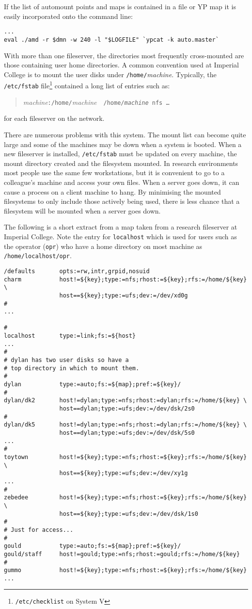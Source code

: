 If the list of automount points and maps is contained in a file or YP map
it is easily incorporated onto the command line:
\begin{verbatim}
...
eval ./amd -r $dmn -w 240 -l "$LOGFILE" `ypcat -k auto.master`
\end{verbatim}

With more than one fileserver, the directories most frequently
cross-mounted are those containing user home directories.
A common convention used at Imperial College is to mount
the user disks under {\tt /home/}{\em machine}.
Typically, the {\tt /etc/fstab} file\footnote{{\tt /etc/checklist}
on System V} contained a long list of entries
such as:
\begin{quote}
{\em machine}{\tt :/home/}{\em machine}\ \ \tt /home/{\em machine}\ nfs \ldots
\end{quote}
for each fileserver on the network.

There are numerous problems with this system.
The mount list can become quite large and some of the machines
may be down when a system is booted.
When a new fileserver is installed, {\tt /etc/fstab} must be
updated on every machine, the mount directory created and
the filesystem mounted.
In research environments most
people use the same few workstations, but it is convenient to go
to a colleague's machine and access your own files.
When a server goes down, it can cause a process on a client machine to
hang.  By minimising the mounted filesystems to only include those
actively being used, there is less chance that a filesystem will be mounted
when a server goes down.

The following is a short extract from a map taken from a research fileserver
at Imperial College.
Note the entry for {\tt localhost} which is used for users such as
the operator ({\tt opr}) who have a home directory on most machine as
{\tt /home/localhost/opr}.
\begin{verbatim}
/defaults       opts:=rw,intr,grpid,nosuid
charm           host!=${key};type:=nfs;rhost:=${key};rfs:=/home/${key} \
                host==${key};type:=ufs;dev:=/dev/xd0g
#
...

#
localhost       type:=link;fs:=${host}
...
#
# dylan has two user disks so have a
# top directory in which to mount them.
#
dylan           type:=auto;fs:=${map};pref:=${key}/
#
dylan/dk2       host!=dylan;type:=nfs;rhost:=dylan;rfs:=/home/${key} \
                host==dylan;type:=ufs;dev:=/dev/dsk/2s0
#
dylan/dk5       host!=dylan;type:=nfs;rhost:=dylan;rfs:=/home/${key} \
                host==dylan;type:=ufs;dev:=/dev/dsk/5s0
...
#
toytown         host!=${key};type:=nfs;rhost:=${key};rfs:=/home/${key} \
                host==${key};type:=ufs;dev:=/dev/xy1g
...
#
zebedee         host!=${key};type:=nfs;rhost:=${key};rfs:=/home/${key} \
                host==${key};type:=ufs;dev:=/dev/dsk/1s0
#
# Just for access...
#
gould           type:=auto;fs:=${map};pref:=${key}/
gould/staff     host!=gould;type:=nfs;rhost:=gould;rfs:=/home/${key}
#
gummo           host!=${key};type:=nfs;rhost:=${key};rfs:=/home/${key}
...
\end{verbatim}

